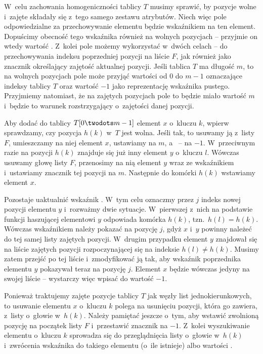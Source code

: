 W~celu zachowania homogeniczności tablicy $T$ musimy sprawić, by pozycje wolne i~zajęte składały się z~tego samego zestawu atrybutów.
Niech więc pole odpowiedzialne za przechowywanie elementu będzie wskaźnikiem na ten element.
Dopuścimy obecność tego wskaźnika również na wolnych pozycjach -- przyjmie on wtedy wartość .
Z~kolei pole  możemy wykorzystać w~dwóch celach -- do przechowywania indeksu poprzedniej pozycji na liście $F$, jak również jako znacznik określający zajętość aktualnej pozycji.
Jeśli tablica $T$ ma długość $m$, to na wolnych pozycjach pole  może przyjąć wartości od 0 do $m-1$ oznaczające indeksy tablicy $T$ oraz wartość $-1$ jako reprezentację wskaźnika pustego.
Przyjmiemy natomiast, że na zajętych pozycjach pole to będzie miało wartość $m$ i~będzie to warunek rozstrzygający o~zajętości danej pozycji.

Aby dodać do tablicy $T[0\twodots m-1]$ element $x$ o~kluczu $k$, wpierw sprawdzamy, czy pozycja $h(k)$ w~$T$ jest wolna.
Jeśli tak, to usuwamy ją z~listy $F$, umieszczamy na niej element $x$, ustawiamy  na $m$, a~ -- na $-1$.
W~przeciwnym razie na pozycji $h(k)$ znajduje się już inny element $y$ o~kluczu $l$.
Wówczas usuwamy głowę listy $F$, przenosimy na nią element $y$ wraz ze wskaźnikiem  i~ustawiamy znacznik  tej pozycji na $m$.
Następnie do komórki $h(k)$ wstawiamy element $x$.

Pozostaje uaktualnić wskaźnik .
W~tym celu oznaczmy przez $j$ indeks nowej pozycji elementu $y$ i~rozważmy dwie sytuacje.
W~pierwszej z~nich na podstawie funkcji haszującej elementowi $y$ odpowiada komórka $h(k)$, tzn.\ $h(l)=h(k)$.
Wówczas wskaźnikiem  należy pokazać na pozycję $j$, gdyż $x$ i~$y$ powinny należeć do tej samej listy zajętych pozycji.
W~drugim przypadku element $y$ znajdował się na liście zajętych pozycji rozpoczynającej się na indeksie $h(l)\ne h(k)$.
Musimy zatem przejść po tej liście i~zmodyfikować ją tak, aby wskaźnik  poprzednika elementu $y$ pokazywał teraz na pozycję $j$.
Element $x$ będzie wówczas jedyny na swojej liście -- wystarczy więc wpisać do  wartość $-1$.

Ponieważ traktujemy zajęte pozycje tablicy $T$ jak węzły list jednokierunkowych, to usuwanie elementu $x$ o~kluczu $k$ polega na usunięciu pozycji, która go zawiera, z~listy o~głowie w~$h(k)$.
Należy pamiętać jeszcze o~tym, aby wstawić zwolnioną pozycję na początek listy $F$ i~przestawić znacznik  na $-1$.
Z~kolei wyszukiwanie elementu o~kluczu $k$ sprowadza się do przeglądnięcia listy o~głowie w~$h(k)$ i~zwrócenia wskaźnika do takiego elementu (o~ile istnieje) albo wartości .

